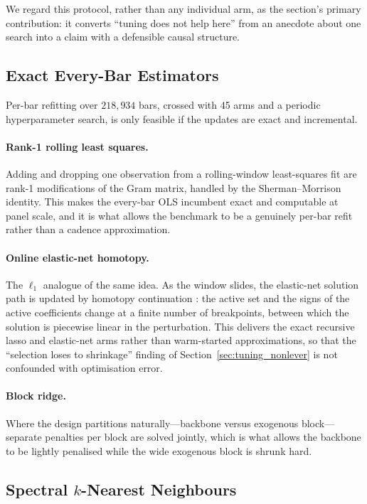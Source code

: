 We regard this protocol, rather than any individual arm, as the section's
primary contribution: it converts ``tuning does not help here'' from an
anecdote about one search into a claim with a defensible causal structure.

\subsection{Exact Every-Bar Estimators}
\label{sec:exact_estimators}

Per-bar refitting over $218{,}934$ bars, crossed with 45 arms and a periodic
hyperparameter search, is only feasible if the updates are exact and
incremental.

\paragraph{Rank-1 rolling least squares.} Adding and dropping one observation
from a rolling-window least-squares fit are rank-1 modifications of the
Gram matrix, handled by the Sherman--Morrison identity. This makes the
every-bar OLS incumbent exact and computable at panel scale, and it is what
allows the benchmark to be a genuinely per-bar refit rather than a cadence
approximation.

\paragraph{Online elastic-net homotopy.} The $\ell_1$ analogue of the same
idea. As the window slides, the elastic-net solution path is updated by
homotopy continuation \citep{Garrigues2008}: the active set and the signs of
the active coefficients change at a finite number of breakpoints, between
which the solution is piecewise linear in the perturbation. This delivers the
exact recursive lasso and elastic-net arms rather than warm-started
approximations, so that the ``selection loses to shrinkage'' finding of
Section~\ref{sec:tuning_nonlever} is not confounded with optimisation error.

\paragraph{Block ridge.} Where the design partitions naturally---backbone
versus exogenous block---separate penalties per block are solved jointly,
which is what allows the backbone to be lightly penalised while the wide
exogenous block is shrunk hard.

\subsection{Spectral \texorpdfstring{$k$}{k}-Nearest Neighbours}
\label{sec:spectral_knn}

